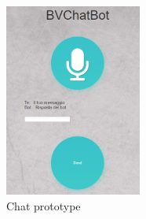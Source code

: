 \begin{figure}[H]
 \centering
  \includegraphics[width=0.4\textwidth]{img/prototype.png}
 \caption{Chat prototype}
\end{figure}

